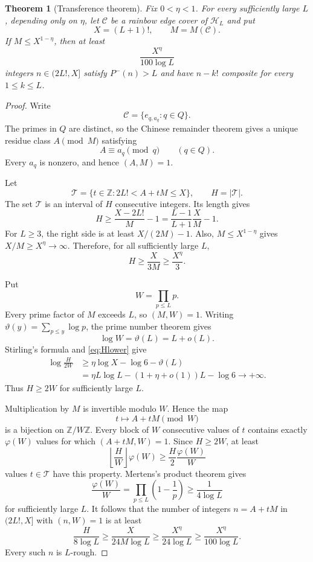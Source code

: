 \documentclass[11pt]{amsart}
\newtheorem{theorem}{Theorem}[section]
\theoremstyle{definition}
\theoremstyle{remark}
\begin{document}
\begin{theorem}[Transference theorem]\label{thm:transference}
Fix $0<\eta<1$.  For every sufficiently large $L$, depending only on
$\eta$, let $\mathcal C$ be a rainbow edge cover of $\mathcal H_L$ and put
\[
X=(L+1)!,
\qquad
M=M(\mathcal C).
\]
If $M\leq X^{1-\eta}$, then at least
\[
\frac{X^\eta}{100\log L}
\]
integers $n\in(2L!,X]$ satisfy $P^-(n)>L$ and have $n-k!$ composite for
every $1\leq k\leq L$.
\end{theorem}

\begin{proof}
Write
\[
\mathcal C=\{e_{q,a_q}:q\in Q\}.
\]
The primes in $Q$ are distinct, so the Chinese remainder theorem gives a
unique residue class $A\pmod M$ satisfying
\begin{equation}\label{eq:A}
A\equiv a_q\pmod q\qquad(q\in Q).
\end{equation}
Every $a_q$ is nonzero, and hence $(A,M)=1$.

Let
\[
\mathcal T=\{t\in\mathbb Z:2L!<A+tM\leq X\},
\qquad
H=|\mathcal T|.
\]
The set $\mathcal T$ is an interval of $H$ consecutive integers.  Its length
gives
\[
H\geq\frac{X-2L!}{M}-1
=\frac{L-1}{L+1}\frac XM-1.
\]
For $L\geq3$, the right side is at least $X/(2M)-1$.  Also,
$M\leq X^{1-\eta}$ gives $X/M\geq X^\eta\to\infty$.  Therefore, for all
sufficiently large $L$,
\begin{equation}\label{eq:Hlower}
H\geq\frac{X}{3M}\geq\frac{X^\eta}{3}.
\end{equation}

Put
\[
W=\prod_{p\leq L}p.
\]
Every prime factor of $M$ exceeds $L$, so $(M,W)=1$.  Writing
$\vartheta(y)=\sum_{p\leq y}\log p$, the prime number theorem gives
\[
\log W=\vartheta(L)=L+o(L).
\]
Stirling's formula and \eqref{eq:Hlower} give
\begin{align*}
\log\frac{H}{2W}
&\geq \eta\log X-\log6-\vartheta(L)\\
&=\eta L\log L-(1+\eta+o(1))L-\log6
\longrightarrow+\infty.
\end{align*}
Thus $H\geq2W$ for sufficiently large $L$.

Multiplication by $M$ is invertible modulo $W$.  Hence the map
\[
t\longmapsto A+tM\pmod W
\]
is a bijection on $\mathbb Z/W\mathbb Z$.  Every block of $W$ consecutive
values of $t$ contains exactly $\varphi(W)$ values for which
$(A+tM,W)=1$.  Since $H\geq2W$, at least
\[
\left\lfloor\frac HW\right\rfloor\varphi(W)
\geq\frac H2\frac{\varphi(W)}W
\]
values $t\in\mathcal T$ have this property.  Mertens's product theorem gives
\[
\frac{\varphi(W)}W
=\prod_{p\leq L}\left(1-\frac1p\right)
\geq\frac1{4\log L}
\]
for sufficiently large $L$.  It follows that the number of integers
$n=A+tM$ in $(2L!,X]$ with $(n,W)=1$ is at least
\[
\frac{H}{8\log L}
\geq\frac{X}{24M\log L}
\geq\frac{X^\eta}{24\log L}
\geq\frac{X^\eta}{100\log L}.
\]
Every such $n$ is $L$-rough.


\end{proof}
\end{document}
